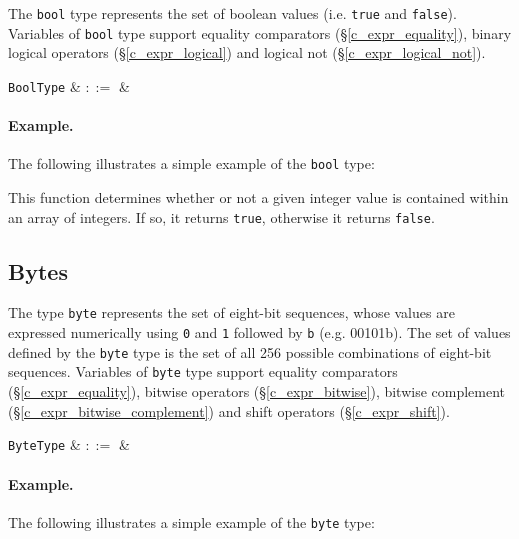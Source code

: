 The \lstinline{bool} type represents the set of boolean values (i.e. \lstinline{true} and \lstinline{false}).  Variables of \lstinline{bool} type support equality comparators (\S\ref{c_expr_equality}), binary logical operators (\S\ref{c_expr_logical}) and logical not (\S\ref{c_expr_logical_not}).

\begin{syntax}
 \verb+BoolType+ & $::=$ &  \\
\end{syntax}

\paragraph{Example.} The following illustrates a simple example of the \lstinline{bool} type:



This function determines whether or not a given integer value is contained within an array of integers.  If so, it returns \lstinline{true}, otherwise it returns \lstinline{false}.


\subsection{Bytes}
\label{c_types_byte}

The type \lstinline{byte} represents the set of eight-bit sequences, whose values are expressed numerically using \lstinline{0} and \lstinline{1} followed by \lstinline{b} (e.g. 00101b).  The set of values defined by the \lstinline{byte} type is the set of all 256 possible combinations of eight-bit sequences.   Variables of \lstinline{byte} type support equality comparators (\S\ref{c_expr_equality}), bitwise operators (\S\ref{c_expr_bitwise}), bitwise complement (\S\ref{c_expr_bitwise_complement}) and shift operators (\S\ref{c_expr_shift}).

\begin{syntax}
 \verb+ByteType+ & $::=$ & \\
\end{syntax}

\paragraph{Example.} The following illustrates a simple example of the \lstinline{byte} type:

